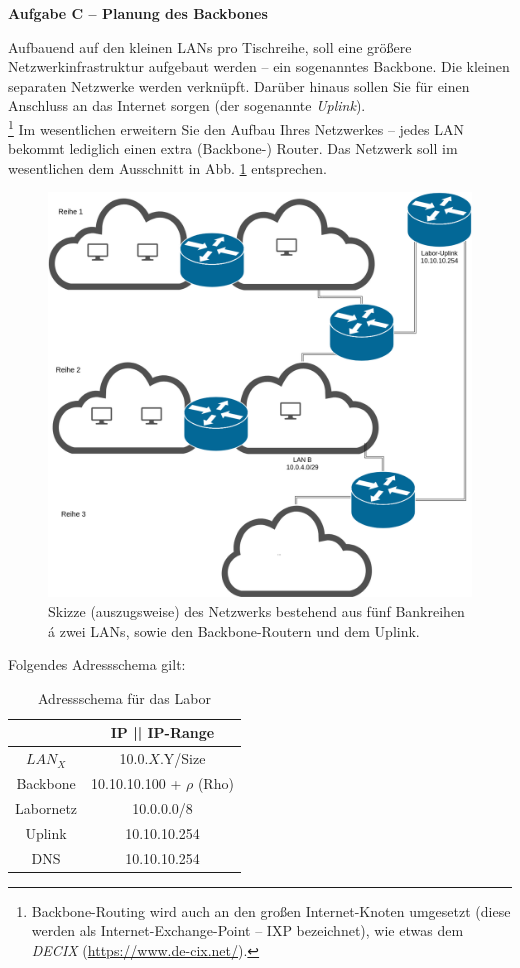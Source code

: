 \documentclass[paper=a4,fontsize=11pt]{scrartcl}%
\numberwithin{equation}{section}
\begin{document}
\begin{center}\Large{\textbf{Aufgabe C -- Planung des Backbones}}\end{center}\vskip0.25in
Aufbauend auf den kleinen LANs pro Tischreihe, soll eine größere Netzwerkinfrastruktur aufgebaut werden -- ein sogenanntes Backbone. Die kleinen separaten Netzwerke werden verknüpft. Darüber hinaus sollen Sie für einen Anschluss an das Internet sorgen (der sogenannte \emph{Uplink}).\\
\footnote{Backbone-Routing wird auch an den großen Internet-Knoten umgesetzt (diese werden als Internet-Exchange-Point -- IXP bezeichnet), wie etwas dem \emph{DECIX} (\url{https://www.de-cix.net/}).}
Im wesentlichen erweitern Sie den Aufbau Ihres Netzwerkes -- jedes LAN bekommt lediglich einen extra (Backbone-) Router. Das Netzwerk soll im wesentlichen dem Ausschnitt in Abb. \ref{backbone} entsprechen.
	\begin{figure}[H]
	\centering
	\includegraphics[scale=0.25]{backbone}
	\caption{Skizze (auszugsweise) des Netzwerks bestehend aus fünf Bankreihen á zwei LANs, sowie den Backbone-Routern und dem Uplink.}
	\label{backbone}
	\end{figure}
Folgendes Adressschema gilt:
\begin{table}[H]
\caption{Adressschema für das Labor}
\label{adress_scheme}
\centering
\begin{tabular}{|c|c|}\hline
 & \textbf{IP  || IP-Range} \\ \hline
 $LAN_X$ & 10.0.$X$.Y/Size \\ \hline
 Backbone & 10.10.10.100 + $\rho$ (Rho)\\ \hline
 Labornetz & 10.0.0.0/8 \\ \hline
 Uplink & 10.10.10.254 \\ \hline
 DNS & 10.10.10.254 \\ \hline
\end{tabular}
\end{table} 
\end{document}
